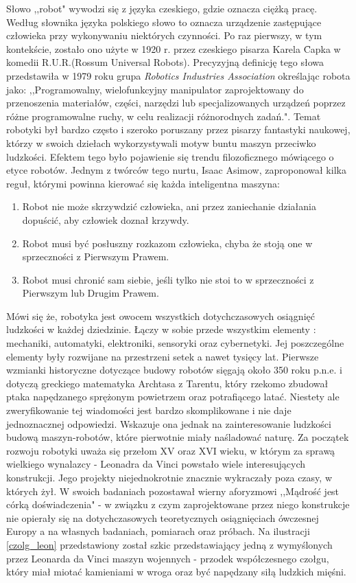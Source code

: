 Słowo ,,robot" wywodzi się z języka czeskiego, gdzie oznacza ciężką pracę. 
Według słownika języka polskiego słowo to oznacza urządzenie zastępujące człowieka przy wykonywaniu niektórych czynności\cite{SJP}. Po raz pierwszy, w tym kontekście, zostało ono użyte w 1920 r. przez czeskiego pisarza Karela \newtie{C}apka w komedii R.U.R.(Rossum Universal Robots)\cite{Czech}. Precyzyjną definicję tego słowa przedstawiła w 1979 roku grupa \textit{Robotics Industries Association} określając robota jako: ,,Programowalny, wielofunkcyjny manipulator zaprojektowany do przenoszenia materiałów, części, narzędzi lub specjalizowanych urządzeń poprzez różne programowalne ruchy, w celu realizacji różnorodnych zadań."\cite{def_robota}.
Temat robotyki był bardzo często i szeroko poruszany przez pisarzy fantastyki naukowej, którzy w swoich dziełach wykorzystywali motyw buntu maszyn przeciwko ludzkości. Efektem tego było pojawienie się trendu filozoficznego mówiącego o etyce robotów. Jednym z twórców tego nurtu, Isaac Asimow, zaproponował kilka reguł, którymi powinna kierować się każda inteligentna maszyna\cite{prawa_robota}:
\begin{enumerate}
\item Robot nie może skrzywdzić człowieka, ani przez zaniechanie działania dopuścić, aby człowiek doznał krzywdy.
\item Robot musi być posłuszny rozkazom człowieka, chyba że stoją one w sprzeczności z Pierwszym Prawem.
\item Robot musi chronić sam siebie, jeśli tylko nie stoi to w sprzeczności z Pierwszym lub Drugim Prawem.
\end{enumerate}
Mówi się że, robotyka jest owocem wszystkich dotychczasowych osiągnięć ludzkości w każdej dziedzinie. Łączy w sobie przede wszystkim elementy : mechaniki, automatyki, elektroniki, sensoryki oraz cybernetyki.
Jej poszczególne elementy były rozwijane na przestrzeni setek a nawet tysięcy lat. Pierwsze wzmianki historyczne dotyczące budowy robotów sięgają około 350 roku p.n.e. i dotyczą greckiego matematyka Archtasa z Tarentu, który rzekomo zbudował ptaka napędzanego sprężonym powietrzem oraz potrafiącego latać. Niestety ale zweryfikowanie tej wiadomości jest bardzo skomplikowane i nie daje jednoznacznej odpowiedzi. Wskazuje ona jednak na zainteresowanie ludzkości budową maszyn-robotów, które pierwotnie miały naśladować naturę. Za początek rozwoju robotyki uważa się przełom XV oraz XVI wieku, w którym za sprawą wielkiego wynalazcy - Leonadra da Vinci powstało wiele interesujących konstrukcji. Jego projekty niejednokrotnie znacznie wykraczały poza czasy, w których żył. W swoich badaniach pozostawał wierny aforyzmowi ,,Mądrość jest
córką doświadczenia" - w związku z czym zaprojektowane przez niego konstrukcje nie opierały się na dotychczasowych teoretycznych osiągnięciach ówczesnej Europy a na własnych badaniach, pomiarach oraz próbach\cite{da_vinci}.  Na ilustracji \ref{czolg_leon} przedstawiony został szkic przedstawiający jedną z wymyślonych przez Leonarda da Vinci maszyn wojennych - przodek współczesnego czołgu, który miał miotać kamieniami w wroga oraz być napędzany siłą ludzkich mięśni.

